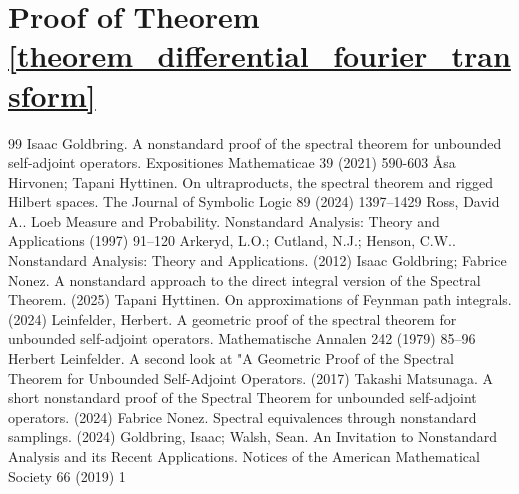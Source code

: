 \documentclass[10pt,a4paper]{amsart}
\def \St{\operatorname{st}}
\def \HOM{\hat{\Omega}}
\def \HMU{\hat{\mu}}
\def \HNU{\hat{\nu}}
\def \HU{\hat{U}}
\begin{document}



\section{Proof of Theorem \ref{theorem_differential_fourier_transform}}\label{appendix_differential}


\begin{thebibliography}{99}
 Isaac Goldbring. A nonstandard proof of the spectral theorem for unbounded self-adjoint operators. Expositiones Mathematicae 39 (2021) 590-603
 Åsa Hirvonen; Tapani Hyttinen. On ultraproducts, the spectral theorem and rigged Hilbert spaces. The Journal of Symbolic Logic 89 (2024) 1397–1429
 Ross, David A.. Loeb Measure and Probability. Nonstandard Analysis: Theory and Applications (1997) 91--120
 Arkeryd, L.O.; Cutland, N.J.; Henson, C.W.. Nonstandard Analysis: Theory and Applications. (2012)
 Isaac Goldbring; Fabrice Nonez. A nonstandard approach to the direct integral version of the Spectral Theorem. (2025)
 Tapani Hyttinen. On approximations of Feynman path integrals. (2024)
 Leinfelder, Herbert. A geometric proof of the spectral theorem for unbounded self-adjoint operators. Mathematische Annalen 242 (1979) 85--96
 Herbert Leinfelder. A second look at "A Geometric Proof of the Spectral Theorem for Unbounded Self-Adjoint Operators. (2017)
 Takashi Matsunaga. A short nonstandard proof of the Spectral Theorem for unbounded self-adjoint operators. (2024)
 Fabrice Nonez. Spectral equivalences through nonstandard samplings. (2024)
 Goldbring, Isaac; Walsh, Sean. An Invitation to Nonstandard Analysis and its Recent Applications. Notices of the American Mathematical Society 66 (2019) 1
\end{thebibliography}
\end{document}
